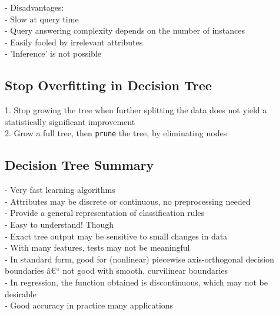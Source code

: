 \documentclass[10pt,landscape,a4paper]{cheatsheet}
\begin{document}
  - Disadvantages:\\

    -   Slow at query time\\
    -   Query answering complexity depends on the number of instances\\
    -   Easily fooled by irrelevant attributes\\
    -   'Inference' is not possible\\

  \subsection{Stop Overfitting in Decision Tree}

  1.  Stop growing the tree when further splitting the data does not
        yield a statistically significant improvement\\

  2.  Grow a full tree, then \texttt{prune} the tree, by
        eliminating nodes

  \subsection{Decision Tree Summary}
  -   Very fast learning algorithms \\
-   Attributes may be discrete or continuous, no preprocessing needed\\
-   Provide a general representation of classification rules\\
-   Easy to understand! Though\\
    -   Exact tree output may be sensitive to small changes in data\\
    -   With many features, tests may not be meaningful\\
-   In standard form, good for (nonlinear) piecewise axis-orthogonal
    decision boundaries â€“ not good with smooth, curvilinear boundaries\\
-   In regression, the function obtained is discontinuous, which may not
    be desirable\\
-   Good accuracy in practice many applications\\
\end{document}

